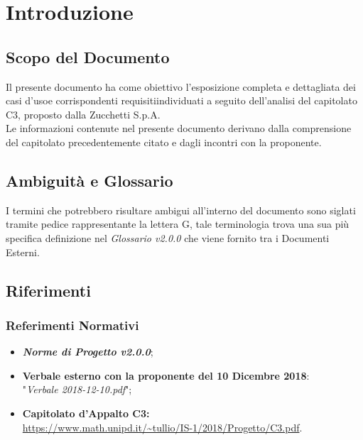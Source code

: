 \section{Introduzione}\label{Intro}

\subsection{Scopo del Documento}
Il presente documento ha come obiettivo l'esposizione completa e dettagliata dei casi d'uso\glossario e corrispondenti requisiti\glossario individuati a seguito dell'analisi del capitolato C3, proposto dalla Zucchetti S.p.A.\\
Le informazioni contenute nel presente documento derivano dalla comprensione del capitolato precedentemente citato e dagli incontri con la proponente.

\subsection{Ambiguità e Glossario}
I termini che potrebbero risultare ambigui all'interno del documento sono siglati tramite pedice rappresentante la lettera \textmd{G}, tale terminologia trova una sua più specifica definizione nel \textit{Glossario v2.0.0} che viene fornito tra i Documenti Esterni.

\subsection{Riferimenti}\label{Riferimenti}
\subsubsection{Referimenti Normativi}
\label{RN}
\begin{itemize}
\item \textbf{\textit{Norme di Progetto v2.0.0}};
\item \textbf{Verbale esterno con la proponente del 10 Dicembre 2018}: \-\\ "\textit{Verbale 2018-12-10.pdf}";
\item \textbf{Capitolato d'Appalto C3:}\\ \url{https://www.math.unipd.it/~tullio/IS-1/2018/Progetto/C3.pdf}.
\end{itemize}

